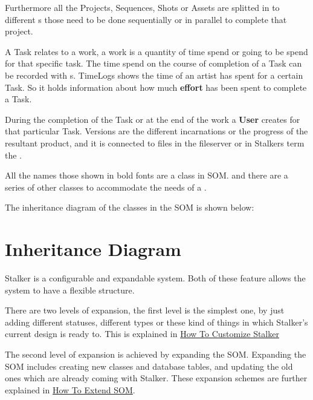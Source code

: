 \documentclass[a4paper,10pt,english]{sphinxmanual}
\begin{document}
Furthermore all the Projects, Sequences, Shots or Assets are splitted in to
different s those need to be done
sequentially or in parallel to complete that project.

A Task relates to a work, a work is a quantity of time spend or going to be
spend for that specific task. The time spend on the course of completion of a
Task can be recorded with s. TimeLogs
shows the time of an artist has spent for a certain Task. So it holds
information about how much \textbf{effort} has been spent to complete a Task.

During the completion of the Task or at the end of the work a \textbf{User} creates
 for that particular Task. Versions
are the different incarnations or the progress of the resultant product, and it
is connected to files in the fileserver or in Stalkers term the
.

All the names those shown in bold fonts are a class in SOM. and there are a
series of other classes to accommodate the needs of a
.

The inheritance diagram of the classes in the SOM is shown below:


\section{Inheritance Diagram}
\label{design:inheritance-diagram-toplevel}\label{design:inheritance-diagram}
Stalker is a configurable and expandable system. Both of these feature allows
the system to have a flexible structure.

There are two levels of expansion, the first level is the simplest one, by just
adding different statuses, different types or these kind of things in
which Stalker's current design is ready to. This is explained in {\hyperref[design:how-to-customize-stalker]{How To
Customize Stalker}}

The second level of expansion is achieved by expanding the SOM. Expanding the
SOM includes creating new classes and database tables, and updating the old
ones which are already coming with Stalker. These expansion schemes are
further explained in {\hyperref[design:how-to-extend-som]{How To Extend SOM}}.
\end{document}
